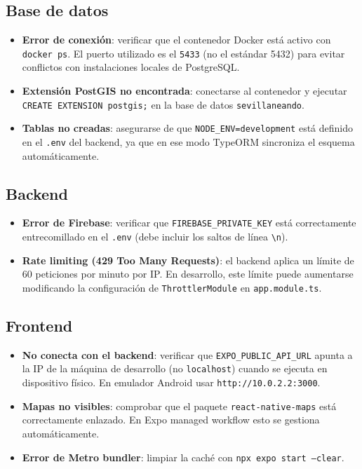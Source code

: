 \subsection{Base de datos}

\begin{itemize}
    \item \textbf{Error de conexión}: verificar que el contenedor Docker está activo con \texttt{docker ps}. El puerto utilizado es el \texttt{5433} (no el estándar 5432) para evitar conflictos con instalaciones locales de PostgreSQL.
    \item \textbf{Extensión PostGIS no encontrada}: conectarse al contenedor y ejecutar \texttt{CREATE EXTENSION postgis;} en la base de datos \texttt{sevillaneando}.
    \item \textbf{Tablas no creadas}: asegurarse de que \texttt{NODE\_ENV=development} está definido en el \texttt{.env} del backend, ya que en ese modo TypeORM sincroniza el esquema automáticamente.
\end{itemize}

\subsection{Backend}

\begin{itemize}
    \item \textbf{Error de Firebase}: verificar que \texttt{FIREBASE\_PRIVATE\_KEY} está correctamente entrecomillado en el \texttt{.env} (debe incluir los saltos de línea \texttt{\textbackslash n}).
    \item \textbf{Rate limiting (429 Too Many Requests)}: el backend aplica un límite de 60 peticiones por minuto por IP. En desarrollo, este límite puede aumentarse modificando la configuración de \texttt{ThrottlerModule} en \texttt{app.module.ts}.
\end{itemize}

\subsection{Frontend}

\begin{itemize}
    \item \textbf{No conecta con el backend}: verificar que \texttt{EXPO\_PUBLIC\_API\_URL} apunta a la IP de la máquina de desarrollo (no \texttt{localhost}) cuando se ejecuta en dispositivo físico. En emulador Android usar \texttt{http://10.0.2.2:3000}.
    \item \textbf{Mapas no visibles}: comprobar que el paquete \texttt{react-native-maps} está correctamente enlazado. En Expo managed workflow esto se gestiona automáticamente.
    \item \textbf{Error de Metro bundler}: limpiar la caché con \texttt{npx expo start --clear}.
\end{itemize}

